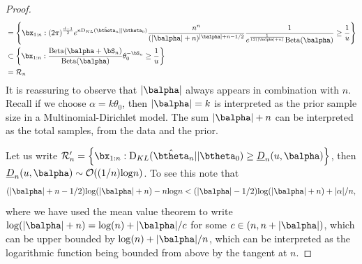 \documentclass[11pt]{article}
\def\log{{\rm log}}
\newcommand{\Beta}{\mathrm{Beta}}
\newcommand{\KL}{\mathrm{D}_{KL}}
\begin{document}
\begin{proof}
\begin{align*}
  &= \left\{ \bx_{1:n} : 
  (2\pi)^{\frac{d-1}{2}}
    e^{n \KL(\hat\btheta_n|| \btheta_0)}
    \frac{n^{n}}{(|\balpha|+n)^{|\balpha| + n - 1/2}}
    \frac{ 1}{e^{\frac{1}{12(|\balpha|+n)}}\Beta(\balpha)} \geq \frac{1}{u} \right\}\\
   &\subset \left\{ \bx_{1:n} : 
    \frac{\Beta(\balpha + \bS_n)}
  {\Beta(\balpha)} \theta_0^{-\bS_n} \geq \frac{1}{u}
\right\}\\
    &= \mathcal{R}_n\\
\end{align*}
It is reassuring to observe that $|\balpha|$ always appears in combination with $n$. Recall if we choose $\alpha=k\theta_0$, then $|\balpha|=k$ is interpreted as the prior sample size in a Multinomial-Dirichlet model.
The sum $|\balpha|+n$ can be interpreted as the total samples, from the data and the prior.

Let us write $\mathcal{R}_n' = \left\{ \bx_{1:n} : \KL(\hat\btheta_n|| \btheta_0) \geq \underline{D}_n(u,\balpha) \right\}$, then $\underline{D}_n(u,\balpha) \sim \mathcal{O}((1/n)\log n)$.
To see this note that 
\begin{align*}
  (|\balpha|+n-1/2)\log(|\balpha|+n)-n\log n < (|\balpha|-1/2)\log(|\balpha|+n) + |\alpha|/n,
\end{align*}
where we have used the mean value theorem to write $\log(|\balpha|+n) = \log(n) +  |\balpha|/c$ for some $c\in (n, n+|\balpha|)$, 
which can be upper bounded by $\log(n) + |\balpha|/n$, which can be interpreted as the logarithmic function being bounded from above by the tangent at $n$.
\end{proof}
\end{document}
